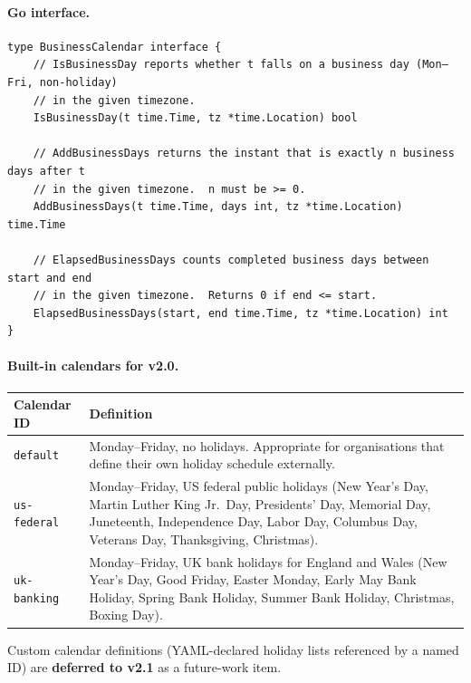 \paragraph{Go interface.}

\begin{verbatim}
type BusinessCalendar interface {
    // IsBusinessDay reports whether t falls on a business day (Mon–Fri, non-holiday)
    // in the given timezone.
    IsBusinessDay(t time.Time, tz *time.Location) bool

    // AddBusinessDays returns the instant that is exactly n business days after t
    // in the given timezone.  n must be >= 0.
    AddBusinessDays(t time.Time, days int, tz *time.Location) time.Time

    // ElapsedBusinessDays counts completed business days between start and end
    // in the given timezone.  Returns 0 if end <= start.
    ElapsedBusinessDays(start, end time.Time, tz *time.Location) int
}
\end{verbatim}

\paragraph{Built-in calendars for v2.0.}

\begin{center}
\begin{tabular}{|l|p{9cm}|}
\hline
\textbf{Calendar ID} & \textbf{Definition} \\
\hline
\texttt{default}    & Monday–Friday, no holidays. Appropriate for organisations that
                      define their own holiday schedule externally. \\
\hline
\texttt{us-federal} & Monday–Friday, US federal public holidays (New Year's Day,
                      Martin Luther King Jr.\ Day, Presidents' Day, Memorial Day,
                      Juneteenth, Independence Day, Labor Day, Columbus Day,
                      Veterans Day, Thanksgiving, Christmas). \\
\hline
\texttt{uk-banking} & Monday–Friday, UK bank holidays for England and Wales
                      (New Year's Day, Good Friday, Easter Monday, Early May Bank
                      Holiday, Spring Bank Holiday, Summer Bank Holiday, Christmas,
                      Boxing Day). \\
\hline
\end{tabular}
\end{center}

Custom calendar definitions (YAML-declared holiday lists referenced by a named ID) are
\textbf{deferred to v2.1} as a future-work item.

